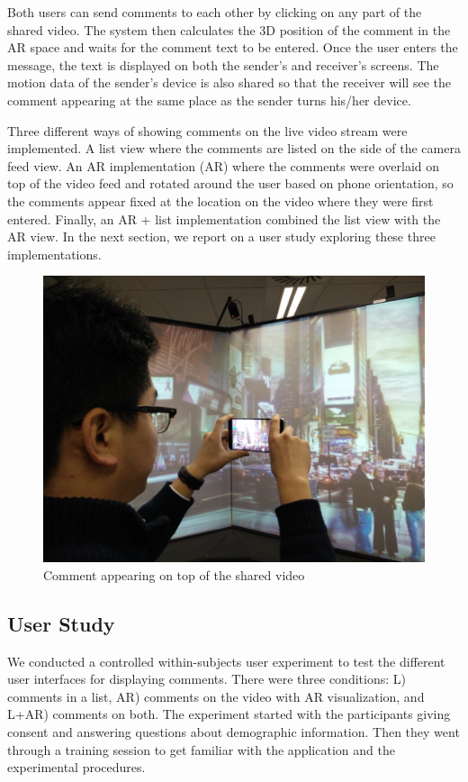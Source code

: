 Both users can send comments to each other by clicking on any part of the shared video. The system then calculates the 3D position of the comment in the AR space and waits for the comment text to be entered. Once the user enters the message, the text is displayed on both the sender's and receiver's screens. The motion data of the sender's device is also shared so that the receiver will see the comment appearing at the same place as the sender turns his/her device. 

Three different ways of showing comments on the live video stream were implemented. A list view where the comments are listed on the side of the camera feed view. An AR implementation (AR) where the comments were overlaid on top of the video feed and rotated around the user based on phone orientation, so the comments appear fixed at the location on the video where they were first entered. Finally, an AR + list implementation combined the list view with the AR view. In the next section, we report on a user study exploring these three implementations.

\begin{figure}[ht]
  \centering
  \includegraphics[width=.8\linewidth]{images/mgia16/participant2}
  \caption{Comment appearing on top of the shared video}
	\label{comments}
\end{figure}


\subsection{User Study}

We conducted a controlled within-subjects user experiment to test the different user interfaces for displaying comments. There were three conditions: L) comments in a list, AR) comments on the video with AR visualization, and L+AR) comments on both. The experiment started with the participants giving consent and answering questions about demographic information. Then they went through a training session to get familiar with the application and the experimental procedures.

